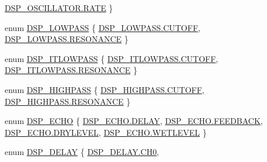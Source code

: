 \begin{DoxyCompactItemize}
\hyperlink{namespace_f_m_o_d_a3e74e763d9647e8780bf2630d035b8daa79521cdea3eff83f517d31c49f9082f5}{D\+S\+P\+\_\+\+O\+S\+C\+I\+L\+L\+A\+T\+O\+R.\+R\+A\+TE}
 \}
\item 
enum \hyperlink{namespace_f_m_o_d_a81a779a15794f5aa6e40661b49b0ba85}{D\+S\+P\+\_\+\+L\+O\+W\+P\+A\+SS} \{ \hyperlink{namespace_f_m_o_d_a81a779a15794f5aa6e40661b49b0ba85a87a6aa3278f5d7f6eadfdb8f66227a63}{D\+S\+P\+\_\+\+L\+O\+W\+P\+A\+S\+S.\+C\+U\+T\+O\+FF}, 
\hyperlink{namespace_f_m_o_d_a81a779a15794f5aa6e40661b49b0ba85a03924ac796abf0c8a6a5f1192c4b4ca5}{D\+S\+P\+\_\+\+L\+O\+W\+P\+A\+S\+S.\+R\+E\+S\+O\+N\+A\+N\+CE}
 \}
\item 
enum \hyperlink{namespace_f_m_o_d_a23540dac7ba2675701f27b9f3259de16}{D\+S\+P\+\_\+\+I\+T\+L\+O\+W\+P\+A\+SS} \{ \hyperlink{namespace_f_m_o_d_a23540dac7ba2675701f27b9f3259de16a87a6aa3278f5d7f6eadfdb8f66227a63}{D\+S\+P\+\_\+\+I\+T\+L\+O\+W\+P\+A\+S\+S.\+C\+U\+T\+O\+FF}, 
\hyperlink{namespace_f_m_o_d_a23540dac7ba2675701f27b9f3259de16a03924ac796abf0c8a6a5f1192c4b4ca5}{D\+S\+P\+\_\+\+I\+T\+L\+O\+W\+P\+A\+S\+S.\+R\+E\+S\+O\+N\+A\+N\+CE}
 \}
\item 
enum \hyperlink{namespace_f_m_o_d_a7ee70b6e5fc1abf09813869232b0f011}{D\+S\+P\+\_\+\+H\+I\+G\+H\+P\+A\+SS} \{ \hyperlink{namespace_f_m_o_d_a7ee70b6e5fc1abf09813869232b0f011a87a6aa3278f5d7f6eadfdb8f66227a63}{D\+S\+P\+\_\+\+H\+I\+G\+H\+P\+A\+S\+S.\+C\+U\+T\+O\+FF}, 
\hyperlink{namespace_f_m_o_d_a7ee70b6e5fc1abf09813869232b0f011a03924ac796abf0c8a6a5f1192c4b4ca5}{D\+S\+P\+\_\+\+H\+I\+G\+H\+P\+A\+S\+S.\+R\+E\+S\+O\+N\+A\+N\+CE}
 \}
\item 
enum \hyperlink{namespace_f_m_o_d_a3f2d0403a6728244732438f42763d741}{D\+S\+P\+\_\+\+E\+C\+HO} \{ \hyperlink{namespace_f_m_o_d_a3f2d0403a6728244732438f42763d741aa9bec09f1dc309241c952d3828424945}{D\+S\+P\+\_\+\+E\+C\+H\+O.\+D\+E\+L\+AY}, 
\hyperlink{namespace_f_m_o_d_a3f2d0403a6728244732438f42763d741ac52770d4f937744b0f17d8718ee270ba}{D\+S\+P\+\_\+\+E\+C\+H\+O.\+F\+E\+E\+D\+B\+A\+CK}, 
\hyperlink{namespace_f_m_o_d_a3f2d0403a6728244732438f42763d741ab80683282a0b59c5a029922dff438747}{D\+S\+P\+\_\+\+E\+C\+H\+O.\+D\+R\+Y\+L\+E\+V\+EL}, 
\hyperlink{namespace_f_m_o_d_a3f2d0403a6728244732438f42763d741a12d7e9da748a11aa281d6bd053de63b4}{D\+S\+P\+\_\+\+E\+C\+H\+O.\+W\+E\+T\+L\+E\+V\+EL}
 \}
\item 
enum \hyperlink{namespace_f_m_o_d_af60a2bc05fe90a710b34bd97b4b4e504}{D\+S\+P\+\_\+\+D\+E\+L\+AY} \{ \newline
\hyperlink{namespace_f_m_o_d_af60a2bc05fe90a710b34bd97b4b4e504a2264c6e9d8288b49bfcf8018d64bc4ec}{D\+S\+P\+\_\+\+D\+E\+L\+A\+Y.\+C\+H0}, 

\end{DoxyCompactItemize}
